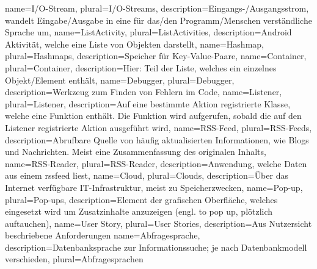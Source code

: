 


{
    name={I/O-Stream},
    plural={I/O-Streams},
    description={Eingangs-/Ausgangsstrom, wandelt Eingabe/Ausgabe in eine für das/den Programm/Menschen verständliche Sprache um},
}
{
    name={ListActivity},
    plural={ListActivities},
    description={Android Aktivität, welche eine Liste von Objekten darstellt},
}
{
    name={Hashmap},
    plural={Hashmaps},
    description={Speicher für Key-Value-Paare},
}
{
    name={Container},
    plural={Container},
    description={Hier: Teil der Liste, welches ein einzelnes Objekt/Element enthält},
}
{
    name={Debugger},
    plural={Debugger},
    description={Werkzeug zum Finden von Fehlern im Code},
}
{
    name={Listener},
    plural={Listener},
    description={Auf eine bestimmte Aktion registrierte Klasse, welche eine Funktion enthält. Die Funktion wird aufgerufen, sobald die auf den Listener registrierte Aktion ausgeführt wird},
}
{
    name={RSS-Feed},
    plural={RSS-Feeds},
    description={Abrufbare Quelle von häufig aktualisierten Informationen, wie Blogs und Nachrichten. Meist eine Zusammenfassung des originalen Inhalts},
}
{
    name={RSS-Reader},
    plural={RSS-Reader},
    description={Anwendung, welche Daten aus einem \gls{rssfeed} liest},
}
{
    name={Cloud},
    plural={Clouds},
    description={Über das Internet verfügbare IT-Infrastruktur, meist zu Speicherzwecken},
}
{
    name={Pop-up},
    plural={Pop-ups},
    description={Element der grafischen Oberfläche, welches eingesetzt wird um Zusatzinhalte anzuzeigen (engl. \glqq{}to pop up\grqq{}, \glqq{}plötzlich auftauchen\grqq{})},
}
{
    name={User Story},
    plural={User Stories},
    description={Aus Nutzersicht beschriebene Anforderungen}
}
{
    name={Abfragesprache},
    description={Datenbanksprache zur Informationssuche; je nach Datenbankmodell verschieden},
    plural={Abfragesprachen}
}

